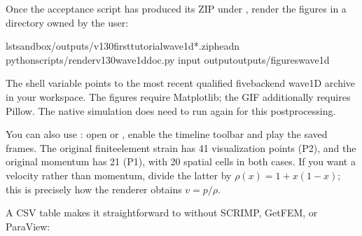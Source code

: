 \documentclass[letterpaper,10pt,english]{sphinxmanual}
\begin{document}
\sphinxAtStartPar
Once the acceptance script
 has produced
its ZIP under , render the figures in a
directory owned by the user:

\begin{sphinxVerbatim}[commandchars=\\\{\}]
ls\PYGZhy{}tsandbox/outputs/v130\PYGZhy{}first\PYGZhy{}tutorial\PYGZhy{}wave1d\PYGZhy{}*.ziphead\PYGZhy{}n
pythonscripts/render\PYGZhy{}v130\PYGZhy{}wave1d\PYGZhy{}doc.py
\PYGZhy{}\PYGZhy{}input
\PYGZhy{}\PYGZhy{}outputoutputs/figures\PYGZhy{}wave1d
\end{sphinxVerbatim}

\sphinxAtStartPar
The shell variable points to the most recent qualified
five\sphinxhyphen{}backend wave\sphinxhyphen{}1D archive in your workspace.
The figures require Matplotlib; the GIF additionally requires
Pillow. The native simulation does  need to run again
for this post\sphinxhyphen{}processing.

\sphinxAtStartPar
You can also use : open
 or
, enable
the timeline toolbar and play the saved frames. The original
finite\sphinxhyphen{}element strain  has 41 visualization points (P2),
and the original momentum  has 21 (P1), with 20
spatial cells in both cases. If you want a velocity rather
than momentum, divide the latter by
\(\rho(x)=1+x(1-x)\); this is precisely how the
renderer obtains \(v=p/\rho\).

\sphinxAtStartPar
A CSV table makes it straightforward to  without SCRIMP,
GetFEM, or ParaView:
\end{document}
